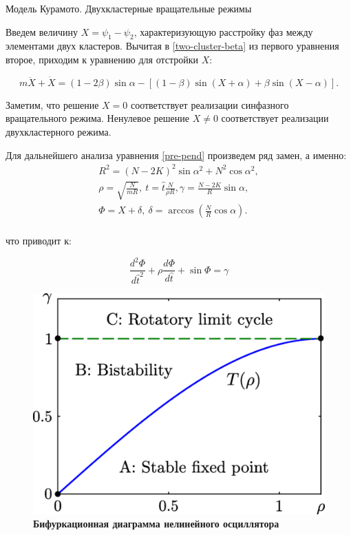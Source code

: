 \begin{chapter}{Модель Курамото. Двухкластерные вращательные режимы}
	
	Введем величину $X = \psi_1 - \psi_2$, характеризующую расстройку фаз между элементами двух кластеров.
	Вычитая в \ref{two-cluster-beta} из первого уравнения второе, приходим к уравнению для отстройки $X$:

	\begin{equation} \label{pre-pend}
		m\ddot{X} + \dot{X} = (1 - 2 \beta) \sin{\alpha} - \left[(1-\beta)\sin{(X + \alpha)} + \beta\sin{(X - \alpha)} \right].
	\end{equation}
	
	Заметим, что решение $X = 0$ соответствует реализации
	синфазного вращательного режима. Ненулевое решение $X \neq 0$ соответствует
	реализации двухкластерного режима.
	
	
	Для дальнейшего анализа уравнения \ref{pre-pend} произведем ряд замен, а именно:
	\begin{align*}
	R^2 = (N - 2K)^2 \sin{\alpha}^2 + N^2 \cos{\alpha}^2, \\
	\rho = \sqrt{\frac{N}{m R}}, \ t = \hat{t} \frac{N}{\rho R}, \gamma = \frac{N - 2K}{R}\sin{\alpha}, \\
	\Phi = X + \delta, \ \delta = \arccos{(\frac{N}{R}\cos{\alpha})}. \\
	\end{align*}
	
	что приводит к:
	
	\begin{equation} \label{pend}
		\frac{d^2 \Phi }{d\hat{t}^2} + \rho \frac{d\Phi}{d\hat{t}} + \sin{\Phi} = \gamma
	\end{equation}

	\begin{figure}[h!]
		\begin{center}
			\includegraphics[width=0.7\columnwidth]{pictures/bf-tricommy.png}
		\end{center}
		\caption{\textbf{Бифуркационная диаграмма нелинейного осциллятора}}
		\label{bf-d}
	\end{figure}


\end{chapter}
